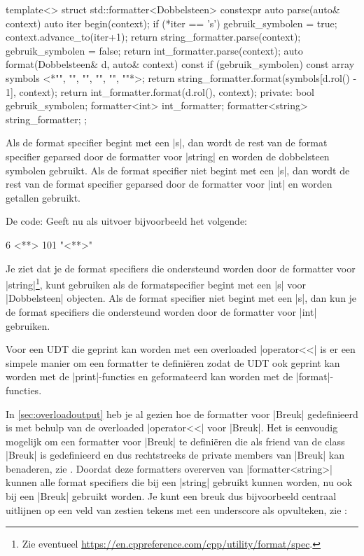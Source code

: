 \begin{cpplstShortInline}
\begin{cpplstfragment}[escapeinside={<*}{*>}]
template<>
struct std::formatter<Dobbelsteen> {
    constexpr auto parse(auto& context) {
        auto iter {begin(context)};
        if (*iter == 's') {
            gebruik_symbolen = true;
            context.advance_to(iter+1);
            return string_formatter.parse(context);
        }
        gebruik_symbolen = false;
        return int_formatter.parse(context);
    }
    auto format(Dobbelsteen& d, auto& context) const {
        if (gebruik_symbolen) {
            const array symbols {<*"", "", "", "", "", ""*>};
            return string_formatter.format(symbols[d.rol() - 1], context);
        }
        return int_formatter.format(d.rol(), context);
    }
private:
    bool gebruik_symbolen;
    formatter<int> int_formatter;
    formatter<string> string_formatter;
};
\end{cpplstfragment}

Als de format specifier begint met een |s|, dan wordt de rest van de format specifier geparsed door de formatter voor |string| en worden de dobbelsteen symbolen gebruikt.
Als de format specifier niet begint met een |s|, dan wordt de rest van de format specifier geparsed door de formatter voor |int| en worden getallen gebruikt.

De code:
Geeft nu als uitvoer bijvoorbeeld het volgende:
\begin{lstfragment}[escapeinside={<*}{*>}]
  6
  <**>
101
"<**>"
\end{lstfragment}
Je ziet dat je de format specifiers die ondersteund worden door de formatter voor |string|\footnote{%
	Zie eventueel \url{https://en.cppreference.com/cpp/utility/format/spec}.
}, kunt gebruiken als de formatspecifier begint met een |s| voor |Dobbelsteen| objecten.
Als de format specifier niet begint met een |s|, dan kun je de format specifiers die ondersteund worden door de formatter voor |int| gebruiken.

Voor een UDT die geprint kan worden met een overloaded |operator<<| is er een simpele manier om een formatter te definiëren zodat de UDT ook geprint kan worden met de |print|-functies en geformateerd kan worden met de |format|-functies.

In \cref{sec:overloadoutput} heb je al gezien hoe de formatter voor |Breuk| gedefinieerd is met behulp van de overloaded |operator<<| voor |Breuk|.
Het is eenvoudig mogelijk om een formatter voor |Breuk| te definiëren die als friend van de class |Breuk| is gedefinieerd en dus rechtstreeks de private members van |Breuk| kan benaderen, zie .
Doordat deze formatters overerven van |formatter<string>| kunnen alle format specifiers die bij een |string| gebruikt kunnen worden, nu ook bij een |Breuk| gebruikt worden.
Je kunt een breuk dus bijvoorbeeld centraal uitlijnen op een veld van zestien tekens met een underscore als opvulteken, zie :


\end{cpplstShortInline}
